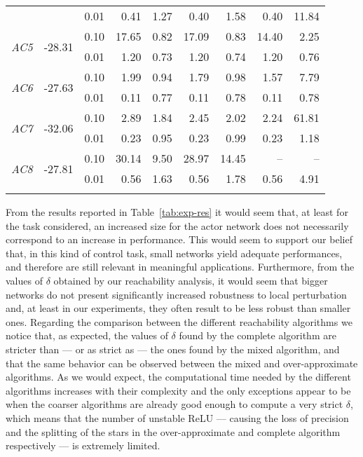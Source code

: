 \begin{table}[t]
\begin{tabular}{c c c rr rr rr}
		& & 0.01 & 0.41 & 1.27 & 0.40 & 1.58 & 0.40 & 11.84 \\
		\multirow{2}{*}{\textit{AC5}} & \multirow{2}{*}{-28.31} &
		0.10 & 17.65 & 0.82 & 17.09 & 0.83 & 14.40 & 2.25 \\
		& & 0.01 & 1.20 & 0.73 & 1.20 & 0.74 & 1.20 & 0.76 \\
		\multirow{2}{*}{\textit{AC6}} & \multirow{2}{*}{-27.63} &
		0.10 & 1.99 & 0.94 & 1.79 & 0.98 & 1.57 & 7.79 \\
		& & 0.01 & 0.11 & 0.77 & 0.11 & 0.78 & 0.11 & 0.78 \\
		\multirow{2}{*}{\textit{AC7}} & \multirow{2}{*}{-32.06} &
		0.10 & 2.89 & 1.84 & 2.45 & 2.02 & 2.24 & 61.81 \\
		& & 0.01 & 0.23 & 0.95 & 0.23 & 0.99 & 0.23 & 1.18 \\
		\multirow{2}{*}{\textit{AC8}} & \multirow{2}{*}{-27.81} &
		0.10 & 30.14 & 9.50 & 28.97 & 14.45 & -- & -- \\
		& & 0.01 & 0.56 & 1.63 & 0.56 & 1.78 & 0.56 & 4.91 \\
		\bottomrule
		\bigskip
	\end{tabular}
\end{table}
%
From the results reported in Table~\ref{tab:exp-res} it would seem that, 
at least for the task considered, an increased size for the actor network does 
not necessarily correspond to an increase in performance. This would seem to 
support our belief that, in this kind of control task, small networks yield 
adequate performances, and therefore are still relevant in meaningful applications. 
Furthermore, from the values of $\delta$ obtained by our reachability analysis, 
it would seem that bigger networks do not present significantly increased 
robustness to local perturbation and, at least in our experiments, they often 
result to be less robust than smaller ones.
Regarding the comparison between the different reachability algorithms we notice 
that, as expected, the values of $\delta$ found by the complete algorithm are 
stricter than --- or as strict as --- the ones found by the mixed algorithm, and 
that the same behavior can be observed between the mixed and over-approximate 
algorithms. As we would expect, the computational time needed by the different 
algorithms increases with their complexity and the only exceptions appear to be
when the coarser algorithms are already good enough to compute a very strict 
$\delta$, which means that the number of unstable ReLU --- causing the loss of 
precision and the splitting of the stars in the over-approximate and complete 
algorithm respectively --- is extremely limited.

